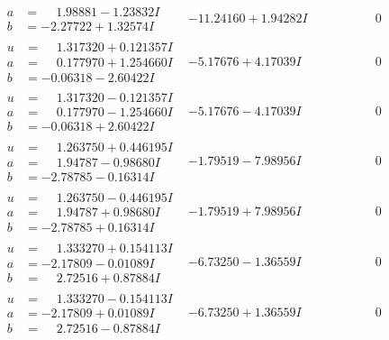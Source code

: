 \documentclass[1p]{elsarticle_modified}
\theoremstyle{definition}
\begin{document}
$$\begin{array}{c|c|c}
\begin{aligned}
a &= \phantom{-}1.98881 - 1.23832 I \\
b &= -2.27722 + 1.32574 I\end{aligned}
 & -11.24160 + 1.94282 I & \phantom{-0.000000 } 0 \\ \hline\begin{aligned}
u &= \phantom{-}1.317320 + 0.121357 I \\
a &= \phantom{-}0.177970 + 1.254660 I \\
b &= -0.06318 - 2.60422 I\end{aligned}
 & -5.17676 + 4.17039 I & \phantom{-0.000000 } 0 \\ \hline\begin{aligned}
u &= \phantom{-}1.317320 - 0.121357 I \\
a &= \phantom{-}0.177970 - 1.254660 I \\
b &= -0.06318 + 2.60422 I\end{aligned}
 & -5.17676 - 4.17039 I & \phantom{-0.000000 } 0 \\ \hline\begin{aligned}
u &= \phantom{-}1.263750 + 0.446195 I \\
a &= \phantom{-}1.94787 - 0.98680 I \\
b &= -2.78785 - 0.16314 I\end{aligned}
 & -1.79519 - 7.98956 I & \phantom{-0.000000 } 0 \\ \hline\begin{aligned}
u &= \phantom{-}1.263750 - 0.446195 I \\
a &= \phantom{-}1.94787 + 0.98680 I \\
b &= -2.78785 + 0.16314 I\end{aligned}
 & -1.79519 + 7.98956 I & \phantom{-0.000000 } 0 \\ \hline\begin{aligned}
u &= \phantom{-}1.333270 + 0.154113 I \\
a &= -2.17809 - 0.01089 I \\
b &= \phantom{-}2.72516 + 0.87884 I\end{aligned}
 & -6.73250 - 1.36559 I & \phantom{-0.000000 } 0 \\ \hline\begin{aligned}
u &= \phantom{-}1.333270 - 0.154113 I \\
a &= -2.17809 + 0.01089 I \\
b &= \phantom{-}2.72516 - 0.87884 I\end{aligned}
 & -6.73250 + 1.36559 I & \phantom{-0.000000 } 0 \\ \hline\begin{aligned}

\end{aligned}
\end{array}$$
\end{document}
